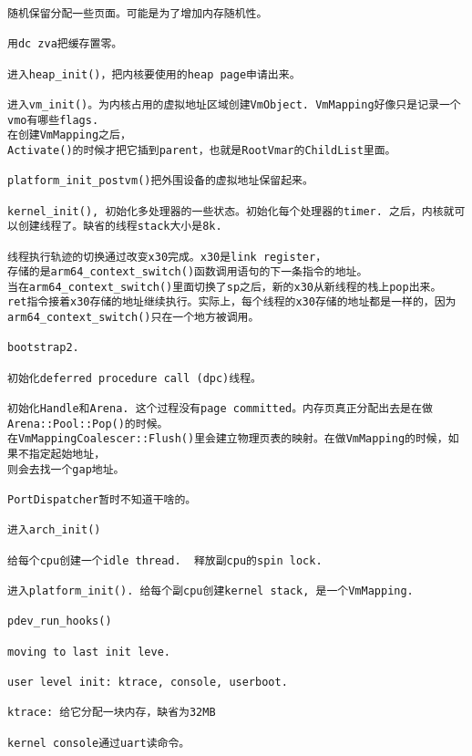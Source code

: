 \begin{verbatim}
随机保留分配一些页面。可能是为了增加内存随机性。

用dc zva把缓存置零。

进入heap_init()，把内核要使用的heap page申请出来。

进入vm_init()。为内核占用的虚拟地址区域创建VmObject. VmMapping好像只是记录一个vmo有哪些flags. 
在创建VmMapping之后，
Activate()的时候才把它插到parent，也就是RootVmar的ChildList里面。

platform_init_postvm()把外围设备的虚拟地址保留起来。

kernel_init(), 初始化多处理器的一些状态。初始化每个处理器的timer. 之后，内核就可以创建线程了。缺省的线程stack大小是8k.

线程执行轨迹的切换通过改变x30完成。x30是link register，
存储的是arm64_context_switch()函数调用语句的下一条指令的地址。
当在arm64_context_switch()里面切换了sp之后，新的x30从新线程的栈上pop出来。
ret指令接着x30存储的地址继续执行。实际上，每个线程的x30存储的地址都是一样的，因为
arm64_context_switch()只在一个地方被调用。

bootstrap2.

初始化deferred procedure call (dpc)线程。

初始化Handle和Arena. 这个过程没有page committed。内存页真正分配出去是在做Arena::Pool::Pop()的时候。
在VmMappingCoalescer::Flush()里会建立物理页表的映射。在做VmMapping的时候，如果不指定起始地址，
则会去找一个gap地址。

PortDispatcher暂时不知道干啥的。

进入arch_init()

给每个cpu创建一个idle thread.  释放副cpu的spin lock.

进入platform_init(). 给每个副cpu创建kernel stack, 是一个VmMapping.

pdev_run_hooks()

moving to last init leve.

user level init: ktrace, console, userboot.

ktrace: 给它分配一块内存，缺省为32MB

kernel console通过uart读命令。

\end{verbatim}













